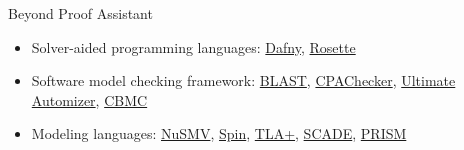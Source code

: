\documentclass[usenames,xcolor=svgnames,11pt,sans,aspectratio=169,handout]{beamer}
\begin{document}
\begin{frame}{Beyond Proof Assistant}
  \begin{itemize}
    \item Solver-aided programming languages:
    \href{https://www.rise4fun.com/Dafny}{Dafny},
    \href{https://emina.github.io/rosette/}{Rosette}
    \item Software model checking framework: 
    \href{http://goto.ucsd.edu/~rjhala/blast.html}{BLAST},
    \href{https://cpachecker.sosy-lab.org}{CPAChecker},
    \href{https://monteverdi.informatik.uni-freiburg.de/tomcat/Website/?ui=tool&tool=automizer}{Ultimate Automizer},
    \href{https://www.cprover.org/cbmc/}{CBMC}
    \item Modeling languages:
    \href{http://nusmv.fbk.eu}{NuSMV},
    \href{http://spinroot.com/spin/whatispin.html}{Spin},
    \href{https://lamport.azurewebsites.net/tla/tla.html}{TLA+},
    \href{https://www.ansys.com/products/embedded-software/ansys-scade-test}{SCADE},
    \href{https://www.prismmodelchecker.org}{PRISM}
  \end{itemize}
\end{frame}
\end{document}
